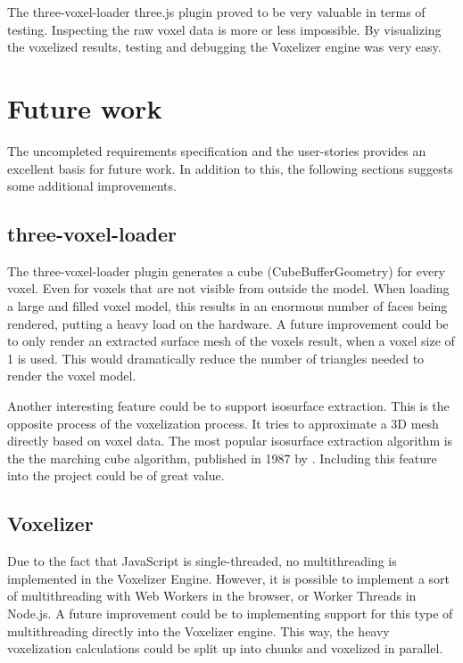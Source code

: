 The three-voxel-loader three.js plugin proved to be very valuable in terms of testing. Inspecting the raw voxel data is more or less impossible. By visualizing the voxelized results, testing and debugging the Voxelizer engine was very easy.

\section{Future work}
\label{sec:discussion-future-work}
The uncompleted requirements specification and the user-stories provides an excellent basis for future work. In addition to this, the following sections suggests some additional improvements.

\subsection{three-voxel-loader}
The three-voxel-loader plugin generates a cube (CubeBufferGeometry) for every voxel. Even for voxels that are not visible from outside the model. When loading a large and filled voxel model, this results in an enormous number of faces being rendered, putting a heavy load on the hardware. A future improvement could be to only render an extracted surface mesh of the voxels result, when a voxel size of 1 is used. This would dramatically reduce the number of triangles needed to render the voxel model.

Another interesting feature could be to support isosurface extraction. This is the opposite process of the voxelization process. It tries to approximate a 3D mesh directly based on voxel data. The most popular isosurface extraction algorithm is the the marching cube algorithm, published in 1987 by \citet{marching-cubes-cline-lorentsen}. Including this feature into the project could be of great value.

\subsection{Voxelizer}
Due to the fact that JavaScript is single-threaded, no multithreading is implemented in the Voxelizer Engine. However, it is possible to implement a sort of multithreading with Web Workers in the browser, or Worker Threads in Node.js. A future improvement could be to implementing support for this type of multithreading directly into the Voxelizer engine. This way, the heavy voxelization calculations could be split up into chunks and voxelized in parallel.
